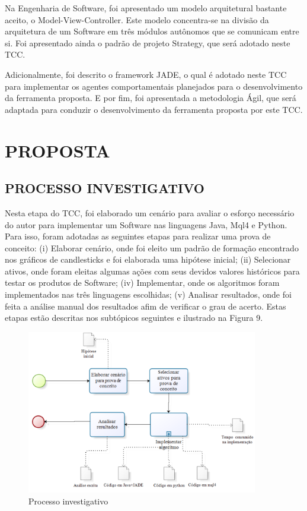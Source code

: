 Na Engenharia de Software, foi apresentado um modelo arquitetural bastante aceito, o Model-View-Controller. Este modelo concentra-se na divisão da arquitetura de um Software em três módulos autônomos que se comunicam entre si. Foi apresentado ainda o padrão de projeto Strategy, que será adotado neste TCC. 

Adicionalmente, foi descrito o framework JADE, o qual é adotado neste TCC para implementar os agentes comportamentais planejados para o desenvolvimento da ferramenta proposta. E por fim, foi apresentada a metodologia Ágil, que será adaptada para conduzir o desenvolvimento da ferramenta proposta por este TCC.

\newpage
\chapter[PROPOSTA]{PROPOSTA}
\section{PROCESSO INVESTIGATIVO}
Nesta etapa do TCC, foi elaborado um cenário para avaliar o esforço necessário do autor para implementar um Software nas linguagens Java, Mql4 e Python. Para isso, foram adotadas as seguintes etapas para realizar uma prova de conceito: (i) Elaborar cenário, onde foi eleito um padrão de formação encontrado nos gráficos de candlesticks e foi elaborada uma hipótese inicial; (ii) Selecionar  ativos, onde foram eleitas algumas ações com seus devidos valores históricos para testar os produtos de  Software; (iv) Implementar, onde os algoritmos foram implementados nas três linguagens escolhidas; (v) Analisar resultados, onde foi feita a análise manual dos resultados afim de verificar o grau de acerto. Estas etapas estão descritas nos subtópicos seguintes e ilustrado na Figura 9.


\begin{figure}[h]
\centering
\label{f09}
\includegraphics[width=0.9\textwidth]{figuras/f09}
\caption{Processo investigativo }

\end{figure}
